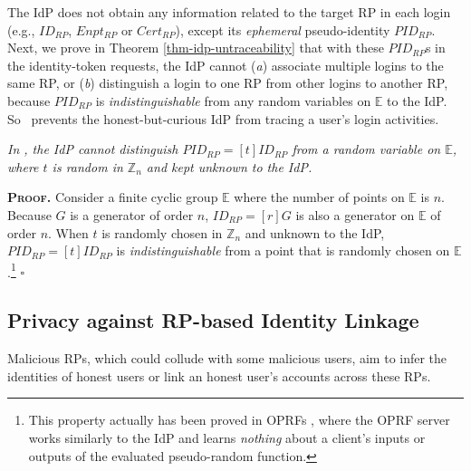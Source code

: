 The IdP does not obtain any information related to the target RP in each login (e.g., $ID_{RP}$, $Enpt_{RP}$ or $Cert_{RP}$), except its \emph{ephemeral} pseudo-identity $PID_{RP}$.
Next, we prove in Theorem \ref{thm-idp-untraceability} that with these $PID_{RP}$s in the identity-token requests,
 the IdP cannot (\emph{a}) associate multiple logins to the same RP, or (\emph{b}) distinguish a login to one RP from other logins to another RP, because $PID_{RP}$ is \emph{indistinguishable} from any random variables on $\mathbb{E}$ to the IdP. So \usso\ prevents the honest-but-curious IdP from tracing a user's login activities.

\begin{thm}
\emph{In \usso, the IdP cannot distinguish $PID_{RP} = [t]ID_{RP}$ from a random variable on $\mathbb{E}$, where $t$ is random in $\mathbb{Z}_n$ and kept unknown to the IdP.}\label{thm-idp-untraceability}
\end{thm}

\noindent\textbf{\textsc{Proof.}}
Consider a finite cyclic group $\mathbb{E}$ where the number of points on $\mathbb{E}$ is $n$.
Because $G$ is a generator of order $n$, $ID_{RP} = [r]G$ is also a generator on $\mathbb{E}$ of order $n$. %
When $t$ is randomly chosen in $\mathbb{Z}_n$ and unknown to the IdP, $PID_{RP} = [t]ID_{RP}$ is \emph{indistinguishable} from a point that is randomly chosen on $\mathbb{E}$ \cite{oprf-proved,voprf-proved}.\footnote{This property actually has been proved in OPRFs \cite{oprf-proved,voprf-proved}, where the OPRF server works similarly to the IdP and learns \emph{nothing} about a client's inputs or outputs of the evaluated pseudo-random function.} \hfill $\square$


\subsection{Privacy against RP-based Identity Linkage}
\label{subsec:RP-privacy}

Malicious RPs,
which could collude with some malicious users,
aim to infer the identities of honest users
    or link an honest user's accounts across these RPs.



